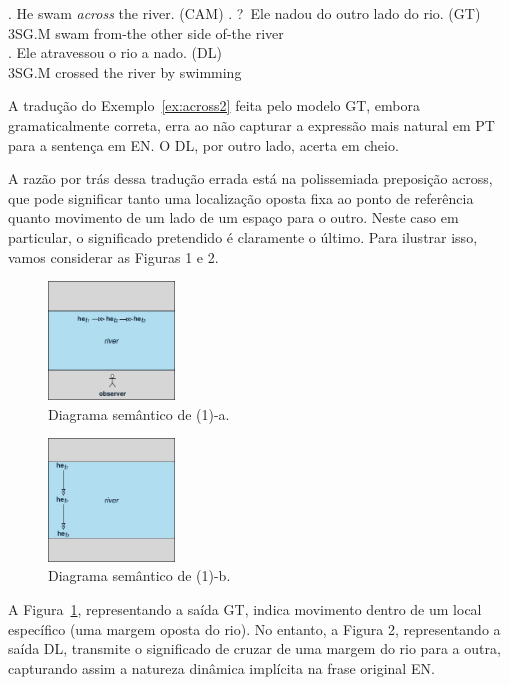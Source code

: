 \documentclass[a4paper, twocolumn, 11pt, twoside]{article}
\begin{document}
\footnotesize
\ex. He swam \emph{across} the river. (CAM)\label{ex:across2}
\ag. ?~Ele nadou do outro lado do rio. (GT) \\  
3SG.M swam from-the other side of-the river\\ 
\bg. Ele atravessou o rio a nado. (DL) \\ 
3SG.M crossed the river by swimming\\
\par
\normalsize

A tradução do Exemplo~\ref{ex:across2} feita pelo modelo GT, embora gramaticalmente correta, erra ao não capturar a expressão mais natural em PT para a sentença em EN. O DL, por outro lado, acerta em cheio.

A razão por trás dessa tradução errada está na polissemiada preposição across, que pode significar tanto uma localização oposta fixa ao ponto de referência quanto movimento de um lado de um espaço para o outro. Neste caso em particular, o significado pretendido é claramente o último. Para ilustrar isso, vamos considerar as Figuras 1 e 2.

\begin{figure}[ht]
  \centering
  \includegraphics[width=0.3\textwidth]{aa-a-2.jpg}
  \caption{Diagrama semântico de (1)-a.}\label{fig:across-1a}
\end{figure}

\begin{figure}[ht]
  \centering
  \includegraphics[width=0.3\textwidth]{bb-b-2.jpg}
  \caption{Diagrama semântico de (1)-b.}\label{fig:across-1b}
\end{figure}


A Figura~\ref{fig:across-1a}, representando a saída GT, indica movimento dentro de um local específico (uma margem oposta do rio). No entanto, a Figura 2, representando a saída DL, transmite o significado de cruzar de uma margem do rio para a outra, capturando assim a natureza dinâmica implícita na frase original EN. 
\end{document}
